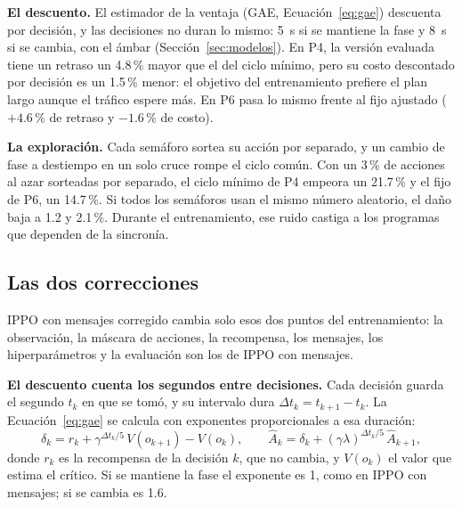 \textbf{El descuento.} El estimador de la ventaja (GAE,
Ecuación~\ref{eq:gae}) descuenta por decisión, y las decisiones no duran
lo mismo: 5~s si se mantiene la fase y 8~s si se cambia, con el ámbar
(Sección~\ref{sec:modelos}). En P4, la versión evaluada tiene un retraso un 4.8\,\% mayor
que el del ciclo mínimo, pero su costo descontado por decisión es un
1.5\,\% menor: el objetivo del entrenamiento prefiere el plan largo
aunque el tráfico espere más. En P6 pasa lo mismo frente al fijo
ajustado ($+4.6$\,\% de retraso y $-1.6$\,\% de costo).

\textbf{La exploración.} Cada semáforo sortea su acción por separado, y
un cambio de fase a destiempo en un solo cruce rompe el ciclo común. Con
un 3\,\% de acciones al azar sorteadas por separado, el ciclo mínimo de
P4 empeora un 21.7\,\% y el fijo de P6, un 14.7\,\%. Si todos los
semáforos usan el mismo número aleatorio, el daño baja a 1.2 y
2.1\,\%. Durante el entrenamiento, ese ruido castiga a los programas que
dependen de la sincronía.

\subsection*{Las dos correcciones}

IPPO con mensajes corregido cambia solo esos dos puntos del
entrenamiento: la observación, la máscara de acciones, la recompensa,
los mensajes, los hiperparámetros y la evaluación son los de IPPO con
mensajes.

\textbf{El descuento cuenta los segundos entre decisiones.} Cada
decisión guarda el segundo $t_k$ en que se tomó, y su intervalo dura
$\Delta t_k = t_{k+1} - t_k$. La Ecuación~\ref{eq:gae} se calcula con
exponentes proporcionales a esa duración:
\begin{equation}
  \delta_k = r_k + \gamma^{\Delta t_k/5}\, V(o_{k+1}) - V(o_k), \qquad
  \hat A_k = \delta_k + (\gamma\lambda)^{\Delta t_k/5}\, \hat A_{k+1},
  \label{eq:gae-smdp}
\end{equation}
donde $r_k$ es la recompensa de la decisión $k$, que no cambia, y
$V(o_k)$ el valor que estima el crítico. Si se mantiene la fase el
exponente es 1, como en IPPO con mensajes; si se cambia es 1.6.

